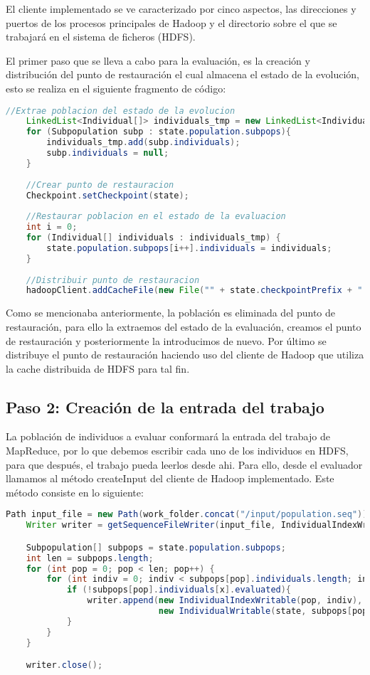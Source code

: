 El cliente implementado se ve caracterizado por cinco aspectos, las direcciones y puertos de los procesos principales de Hadoop y el directorio sobre el que se trabajar\'a en el sistema de ficheros (HDFS).

El primer paso que se lleva a cabo para la evaluación, es la creación y distribución del punto de restauración el cual almacena el estado de la evolución, esto se realiza en el siguiente fragmento de código:

\begin{lstlisting}[language=Java]
	//Extrae poblacion del estado de la evolucion
	LinkedList<Individual[]> individuals_tmp = new LinkedList<Individual[]>();
	for (Subpopulation subp : state.population.subpops){
		individuals_tmp.add(subp.individuals);
		subp.individuals = null;
	}
	
	//Crear punto de restauracion
	Checkpoint.setCheckpoint(state);
	
	//Restaurar poblacion en el estado de la evaluacion
	int i = 0;
	for (Individual[] individuals : individuals_tmp) {
		state.population.subpops[i++].individuals = individuals;
	}
			
	//Distribuir punto de restauracion
	hadoopClient.addCacheFile(new File("" + state.checkpointPrefix + "." + state.generation + ".gz"), true, true);
\end{lstlisting}

Como se mencionaba anteriormente, la población es eliminada del punto de restauración, para ello la extraemos del estado de la evaluación, creamos el punto de restauración y posteriormente la introducimos de nuevo. Por \'ultimo se distribuye el punto de restauración haciendo uso del cliente de Hadoop que utiliza la cache distribuida de HDFS para tal fin.

\subsection{Paso 2: Creación de la entrada del trabajo}

La población de individuos a evaluar conformar\'a la entrada del trabajo de MapReduce, por lo que debemos escribir cada uno de los individuos en HDFS, para que después, el trabajo pueda leerlos desde ahi. Para ello, desde el evaluador llamamos al método createInput del cliente de Hadoop implementado. Este método consiste en lo siguiente:

\begin{lstlisting}[language=Java]
	Path input_file = new Path(work_folder.concat("/input/population.seq"));
	Writer writer = getSequenceFileWriter(input_file, IndividualIndexWritable.class, IndividualWritable.class);

	Subpopulation[] subpops = state.population.subpops;
	int len = subpops.length;
	for (int pop = 0; pop < len; pop++) {
		for (int indiv = 0; indiv < subpops[pop].individuals.length; indiv++) {
			if (!subpops[pop].individuals[x].evaluated){
				writer.append(new IndividualIndexWritable(pop, indiv), 
						      new IndividualWritable(state, subpops[pop].individuals[indiv]));
			}
		}
	}

	writer.close();
\end{lstlisting}

